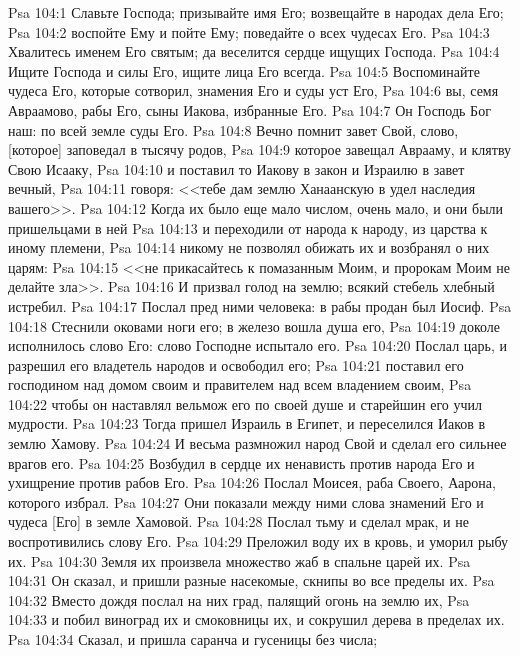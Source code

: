 \vs Psa 104:1 Славьте Господа; призывайте имя Его; возвещайте в народах дела Его;
\vs Psa 104:2 воспойте Ему и пойте Ему; поведайте о всех чудесах Его.
\vs Psa 104:3 Хвалитесь именем Его святым; да веселится сердце ищущих Господа.
\vs Psa 104:4 Ищите Господа и силы Его, ищите лица Его всегда.
\vs Psa 104:5 Воспоминайте чудеса Его, которые сотворил, знамения Его и суды уст Его,
\vs Psa 104:6 вы, семя Авраамово, рабы Его, сыны Иакова, избранные Его.
\vs Psa 104:7 Он Господь Бог наш: по всей земле суды Его.
\vs Psa 104:8 Вечно помнит завет Свой, слово, [которое] заповедал в тысячу родов,
\vs Psa 104:9 которое завещал Аврааму, и клятву Свою Исааку,
\vs Psa 104:10 и поставил то Иакову в закон и Израилю в завет вечный,
\vs Psa 104:11 говоря: <<тебе дам землю Ханаанскую в удел наследия вашего>>.
\vs Psa 104:12 Когда их было еще мало числом, очень мало, и они были пришельцами в ней
\vs Psa 104:13 и переходили от народа к народу, из царства к иному племени,
\vs Psa 104:14 никому не позволял обижать их и возбранял о них царям:
\vs Psa 104:15 <<не прикасайтесь к помазанным Моим, и пророкам Моим не делайте зла>>.
\vs Psa 104:16 И призвал голод на землю; всякий стебель хлебный истребил.
\vs Psa 104:17 Послал пред ними человека: в рабы продан был Иосиф.
\vs Psa 104:18 Стеснили оковами ноги его; в железо вошла душа его,
\vs Psa 104:19 доколе исполнилось слово Его: слово Господне испытало его.
\vs Psa 104:20 Послал царь, и разрешил его владетель народов и освободил его;
\vs Psa 104:21 поставил его господином над домом своим и правителем над всем владением своим,
\vs Psa 104:22 чтобы он наставлял вельмож его по своей душе и старейшин его учил мудрости.
\vs Psa 104:23 Тогда пришел Израиль в Египет, и переселился Иаков в землю Хамову.
\vs Psa 104:24 И весьма размножил  народ Свой и сделал его сильнее врагов его.
\vs Psa 104:25 Возбудил в сердце их ненависть против народа Его и ухищрение против рабов Его.
\vs Psa 104:26 Послал Моисея, раба Своего, Аарона, которого избрал.
\vs Psa 104:27 Они показали между ними слова знамений Его и чудеса [Его] в земле Хамовой.
\vs Psa 104:28 Послал тьму и сделал мрак, и не воспротивились слову Его.
\vs Psa 104:29 Преложил воду их в кровь, и уморил рыбу их.
\vs Psa 104:30 Земля их произвела множество жаб  в спальне царей их.
\vs Psa 104:31 Он сказал, и пришли разные насекомые, скнипы во все пределы их.
\vs Psa 104:32 Вместо дождя послал на них град, палящий огонь на землю их,
\vs Psa 104:33 и побил виноград их и смоковницы их, и сокрушил дерева в пределах их.
\vs Psa 104:34 Сказал, и пришла саранча и гусеницы без числа;
